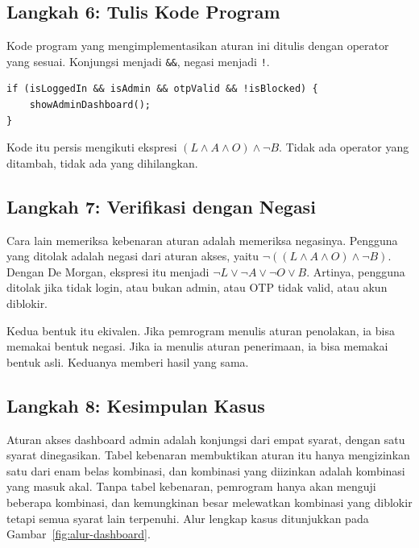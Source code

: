 \documentclass[11pt,a4paper]{article}
\begin{document}
\subsection{Langkah 6: Tulis Kode Program}

Kode program yang mengimplementasikan aturan ini ditulis dengan operator yang sesuai. Konjungsi menjadi \texttt{\&\&}, negasi menjadi \texttt{!}.

\begin{lstlisting}[style=code]
if (isLoggedIn && isAdmin && otpValid && !isBlocked) {
    showAdminDashboard();
}
\end{lstlisting}

Kode itu persis mengikuti ekspresi $(L \wedge A \wedge O) \wedge \neg B$. Tidak ada operator yang ditambah, tidak ada yang dihilangkan.

\subsection{Langkah 7: Verifikasi dengan Negasi}

Cara lain memeriksa kebenaran aturan adalah memeriksa negasinya. Pengguna yang ditolak adalah negasi dari aturan akses, yaitu $\neg((L \wedge A \wedge O) \wedge \neg B)$. Dengan De Morgan, ekspresi itu menjadi $\neg L \vee \neg A \vee \neg O \vee B$. Artinya, pengguna ditolak jika tidak login, atau bukan admin, atau OTP tidak valid, atau akun diblokir.

Kedua bentuk itu ekivalen. Jika pemrogram menulis aturan penolakan, ia bisa memakai bentuk negasi. Jika ia menulis aturan penerimaan, ia bisa memakai bentuk asli. Keduanya memberi hasil yang sama.

\subsection{Langkah 8: Kesimpulan Kasus}

Aturan akses dashboard admin adalah konjungsi dari empat syarat, dengan satu syarat dinegasikan. Tabel kebenaran membuktikan aturan itu hanya mengizinkan satu dari enam belas kombinasi, dan kombinasi yang diizinkan adalah kombinasi yang masuk akal. Tanpa tabel kebenaran, pemrogram hanya akan menguji beberapa kombinasi, dan kemungkinan besar melewatkan kombinasi yang diblokir tetapi semua syarat lain terpenuhi. Alur lengkap kasus ditunjukkan pada Gambar~\ref{fig:alur-dashboard}.
\end{document}
